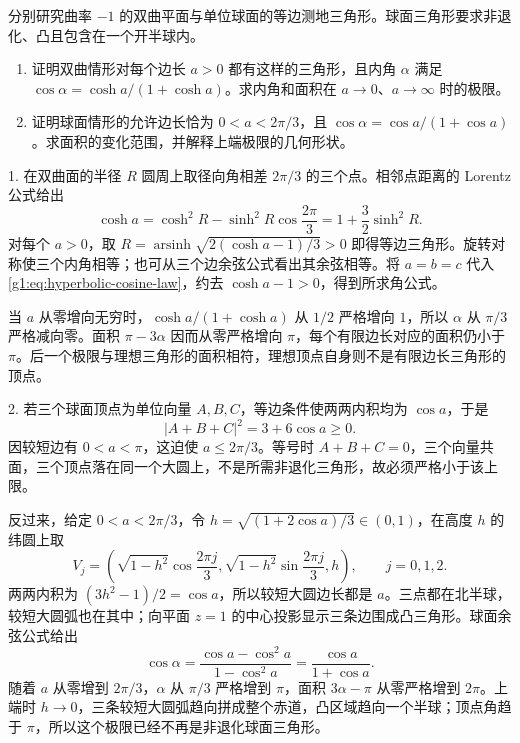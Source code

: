 \begin{exercise}
	\label{g1:ex:equilateral-curvature-triangles}
	分别研究曲率 \(-1\) 的双曲平面与单位球面的等边测地三角形。球面三角形要求非退化、凸且包含在一个开半球内。
	\begin{enumerate}
		\item 证明双曲情形对每个边长 \(a>0\) 都有这样的三角形，且内角 \(\alpha\) 满足 \(\cos\alpha=\cosh a/(1+\cosh a)\)。求内角和面积在 \(a\to0\)、\(a\to\infty\) 时的极限。
		\item 证明球面情形的允许边长恰为 \(0<a<2\pi/3\)，且 \(\cos\alpha=\cos a/(1+\cos a)\)。求面积的变化范围，并解释上端极限的几何形状。
	\end{enumerate}
\end{exercise}
\begin{solution}
	1. 在双曲面的半径 \(R\) 圆周上取径向角相差 \(2\pi/3\) 的三个点。相邻点距离的 Lorentz 公式给出
	\[
		\cosh a=\cosh^2R-\sinh^2R\cos\frac{2\pi}3
		=1+\frac32\sinh^2R.
	\]
	对每个 \(a>0\)，取 \(R=\operatorname{arsinh}\sqrt{2(\cosh a-1)/3}>0\) 即得等边三角形。旋转对称使三个内角相等；也可从三个边余弦公式看出其余弦相等。将 \(a=b=c\) 代入\eqref{g1:eq:hyperbolic-cosine-law}，约去 \(\cosh a-1>0\)，得到所求角公式。

	当 \(a\) 从零增向无穷时，\(\cosh a/(1+\cosh a)\) 从 \(1/2\) 严格增向 \(1\)，所以 \(\alpha\) 从 \(\pi/3\) 严格减向零。面积 \(\pi-3\alpha\) 因而从零严格增向 \(\pi\)，每个有限边长对应的面积仍小于 \(\pi\)。后一个极限与理想三角形的面积相符，理想顶点自身则不是有限边长三角形的顶点。

	2. 若三个球面顶点为单位向量 \(A,B,C\)，等边条件使两两内积均为 \(\cos a\)，于是
	\[
		|A+B+C|^2=3+6\cos a\geq0.
	\]
	因较短边有 \(0<a<\pi\)，这迫使 \(a\leq2\pi/3\)。等号时 \(A+B+C=0\)，三个向量共面，三个顶点落在同一个大圆上，不是所需非退化三角形，故必须严格小于该上限。

	反过来，给定 \(0<a<2\pi/3\)，令 \(h=\sqrt{(1+2\cos a)/3}\in(0,1)\)，在高度 \(h\) 的纬圆上取
	\[
		V_j=\left(\sqrt{1-h^2}\cos\frac{2\pi j}3,
		\sqrt{1-h^2}\sin\frac{2\pi j}3,h\right),\qquad j=0,1,2.
	\]
	两两内积为 \((3h^2-1)/2=\cos a\)，所以较短大圆边长都是 \(a\)。三点都在北半球，较短大圆弧也在其中；向平面 \(z=1\) 的中心投影显示三条边围成凸三角形。球面余弦公式给出
	\[
		\cos\alpha=\frac{\cos a-\cos^2a}{1-\cos^2a}
		=\frac{\cos a}{1+\cos a}.
	\]
	随着 \(a\) 从零增到 \(2\pi/3\)，\(\alpha\) 从 \(\pi/3\) 严格增到 \(\pi\)，面积 \(3\alpha-\pi\) 从零严格增到 \(2\pi\)。上端时 \(h\to0\)，三条较短大圆弧趋向拼成整个赤道，凸区域趋向一个半球；顶点角趋于 \(\pi\)，所以这个极限已经不再是非退化球面三角形。
\end{solution}


